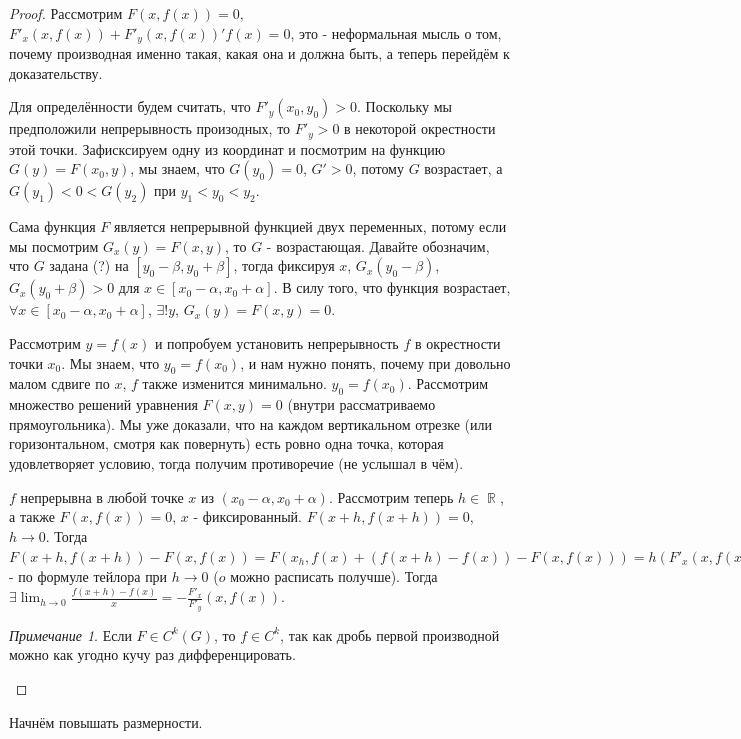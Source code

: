 \documentclass[a4paper,100pt]{article}
\theoremstyle{indented}
\theoremstyle{definition}
\theoremstyle{remark}
\newtheorem{remark}{Примечание}
\DeclareMathOperator{\RR}{\mathbb{R}}
\begin{document}
\begin{proof}
    Рассмотрим $F(x, f(x))=0$, $F'_x(x, f(x))+F'_y(x, f(x))'f(x)=0$, это - неформальная мысль о том, почему производная именно такая, какая она и должна быть, а теперь перейдём к доказательству. \ 

    Для определённости будем считать, что $F'_y(x_0, y_0)>0$. Поскольку мы предположили непрерывность произодных, то $F'_y>0$ в некоторой окрестности этой точки. Зафисксируем одну из координат и посмотрим на функцию $G(y)=F(x_0, y)$, мы знаем, что $G(y_0)=0$, $G'>0$, потому $G$ возрастает, а $G(y_1)<0<G(y_2)$ при $y_1<y_0<y_2$. \ 

    Сама функция $F$ является непрерывной функцией двух переменных, потому если мы посмотрим $G_x(y)=F(x, y)$, то $G$ - возрастающая. Давайте обозначим, что $G$ задана (?) на $[y_0-\beta, y_0+\beta]$, тогда фиксируя $x$, $G_x(y_0-\beta)$, $G_x(y_0+\beta)>0$ для $x\in [x_0-\alpha, x_0+\alpha]$. В силу того, что функция возрастает, $\forall x\in [x_0-\alpha, x_0+\alpha]$, $\exists !y$, $G_x(y)=F(x, y)=0$. \ 

    Рассмотрим $y=f(x)$ и попробуем установить непрерывность $f$ в окрестности точки $x_0$. Мы знаем, что $y_0=f(x_0)$, и нам нужно понять, почему при довольно малом сдвиге по $x$, $f$ также изменится минимально. $y_0=f(x_0)$. Рассмотрим множество решений уравнения $F(x, y)=0$ (внутри рассматриваемо прямоугольника). Мы уже доказали, что на каждом вертикальном отрезке (или горизонтальном, смотря как повернуть) есть ровно одна точка, которая удовлетворяет условию, тогда получим противоречие (не услышал в чём). \ 

    $f$ непрерывна в любой точке $x$ из $(x_0-\alpha, x_0+\alpha)$. Рассмотрим теперь $h\in \RR$, а также $F(x, f(x))=0$, $x$ - фиксированный. $F(x+h, f(x+h))=0$, $h\rightarrow 0$. Тогда $F(x+h, f(x+h))-F(x, f(x))=F(x_h, f(x)+(f(x+h)-f(x))-F(x, f(x))) = h(F'_x(x, f(x)))+h\cdot \frac{f(x+h)-f(x)}{h}F_y'(x, f(x))+o(h)=0$ - по формуле тейлора при $h\rightarrow 0$ ($o$ можно расписать получше). Тогда $\exists \lim_{h\rightarrow 0}\frac{f(x+h)-f(x)}{x}=-\frac{F'_x}{F'_y}(x, f(x))$. 

    \begin{remark}
        Если $F\in C^k(G)$, то $f\in C^k$, так как дробь первой производной можно как угодно кучу раз дифференцировать. 
    \end{remark}
\end{proof}

Начнём повышать размерности. \\
\end{document}
